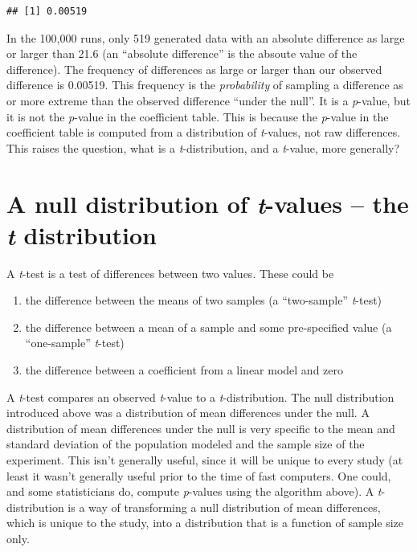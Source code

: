 \documentclass[]{book}
\providecommand{\tightlist}{%
  \setlength{\itemsep}{0pt}\setlength{\parskip}{0pt}}
\begin{document}
\begin{verbatim}
## [1] 0.00519
\end{verbatim}

In the 100,000 runs, only 519 generated data with an absolute difference as large or larger than 21.6 (an ``absolute difference'' is the absoute value of the difference). The frequency of differences as large or larger than our observed difference is 0.00519. This frequency is the \emph{probability} of sampling a difference as or more extreme than the observed difference ``under the null''. It is a \emph{p}-value, but it is not the \emph{p}-value in the coefficient table. This is because the \emph{p}-value in the coefficient table is computed from a distribution of \emph{t}-values, not raw differences. This raises the question, what is a \emph{t}-distribution, and a \emph{t}-value, more generally?

\hypertarget{a-null-distribution-of-t-values-the-t-distribution}{%
\section{\texorpdfstring{A null distribution of \emph{t}-values -- the \emph{t} distribution}{A null distribution of t-values -- the t distribution}}\label{a-null-distribution-of-t-values-the-t-distribution}}

A \emph{t}-test is a test of differences between two values. These could be

\begin{enumerate}
\def\labelenumi{\arabic{enumi}.}
\tightlist
\item
  the difference between the means of two samples (a ``two-sample'' \emph{t}-test)
\item
  the difference between a mean of a sample and some pre-specified value (a ``one-sample'' \emph{t}-test)
\item
  the difference between a coefficient from a linear model and zero
\end{enumerate}

A \emph{t}-test compares an observed \emph{t}-value to a \emph{t}-distribution. The null distribution introduced above was a distribution of mean differences under the null. A distribution of mean differences under the null is very specific to the mean and standard deviation of the population modeled and the sample size of the experiment. This isn't generally useful, since it will be unique to every study (at least it wasn't generally useful prior to the time of fast computers. One could, and some statisticians do, compute \emph{p}-values using the algorithm above). A \emph{t}-distribution is a way of transforming a null distribution of mean differences, which is unique to the study, into a distribution that is a function of sample size only.
\end{document}
